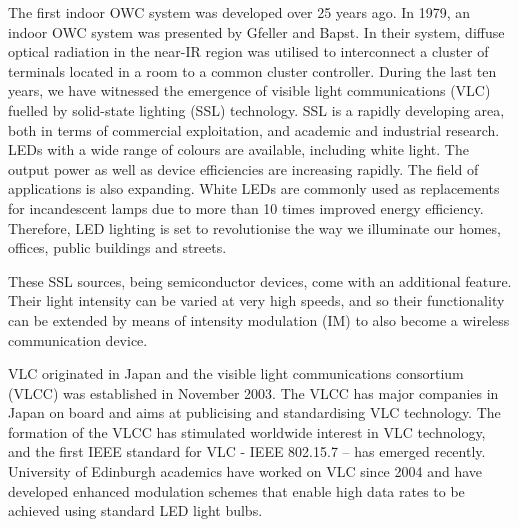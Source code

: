 The first indoor OWC system was developed over 25 years ago. In 1979, an indoor OWC system was
presented by Gfeller and Bapst. In their system, diffuse optical radiation in the near-IR region was
utilised to interconnect a cluster of terminals located in a room to a common cluster controller.
During the last ten years, we have witnessed the emergence of visible light communications (VLC) fuelled
by solid-state lighting (SSL) technology. SSL is a rapidly developing area, both in terms of commercial
exploitation, and academic and industrial research. LEDs with a wide range of colours are available,
including white light. The output power as well as device efficiencies are increasing rapidly. The field of
applications is also expanding. White LEDs are commonly used as replacements for incandescent lamps due
to more than 10 times improved energy efficiency. Therefore, LED lighting is set to revolutionise the way
we illuminate our homes, offices, public buildings and streets.

These SSL sources, being semiconductor devices, come with an additional feature. Their light intensity can
be varied at very high speeds, and so their functionality can be extended by means of intensity modulation
(IM) to also become a wireless communication device.

VLC originated in Japan and the visible light communications consortium (VLCC) was established in
November 2003. The VLCC has major companies in Japan on board and aims at publicising and
standardising VLC technology. The formation of the VLCC has stimulated worldwide interest in VLC
technology, and the first IEEE standard for VLC - IEEE 802.15.7 – has emerged recently. University of
Edinburgh academics have worked on VLC since 2004 and have developed enhanced modulation schemes
that enable high data rates to be achieved using standard LED light bulbs.


